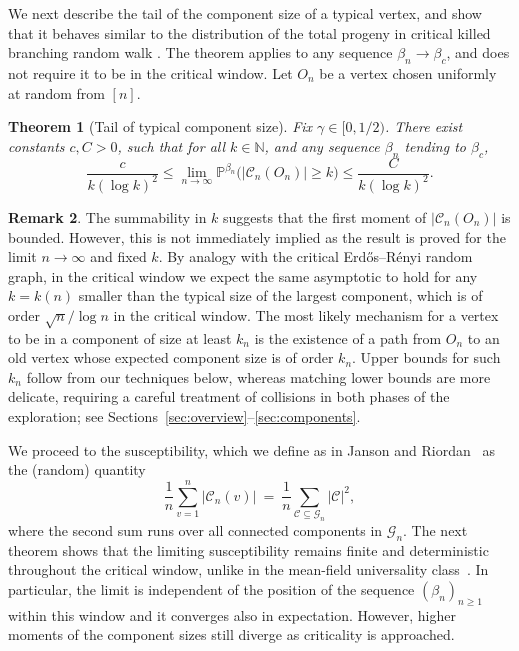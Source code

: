 \documentclass[a4paper, a4wide, 10pt, reqno]{amsart}
\theoremstyle{plain}
\newtheorem{theorem}{Theorem}[section]
\theoremstyle{definition}
\newtheorem{remark}[theorem]{Remark}
\numberwithin{equation}{section}
\newcommand{\N}{{\mathbb N}}
\newcommand{\sC}{{\mathscr C}}
\newcommand{\sG}{{\mathscr G}}
\begin{document}
We next describe the tail of the component size of a typical vertex, and show that it behaves similar to the distribution of the total progeny in critical killed branching random walk \cite{aidekon2010tail, AidekonHuZindy}. The theorem applies  to any sequence $\beta_n\to\beta_c$, and does not require it to be in  the critical window. Let $O_n$ be a vertex chosen uniformly at random from $[n]$.  

\begin{theorem}[Tail of typical component size]\label{thm:typtail}
	Fix $\gamma\in[0,1/2)$.
    There exist constants $c, C>0$, such that for all $k\in\N$, and any sequence $\beta_n$ tending to $\beta_c$,
	\begin{equation}\label{eq:typtail}
        \frac{c}{k(\log k)^2} \leq \lim_{n \to\infty}\mathbb P^{\beta_n} \big( |\sC_{n}(O_n)| \ge k \big)\leq \frac{C}{k(\log k)^2}.
	\end{equation}
\end{theorem}
\begin{remark}
The summability in $k$ suggests that the first moment of $|\sC_n(O_n)|$ is bounded. However, this is not immediately implied as the result is proved for the limit $n\to\infty$ and fixed $k$.  
By analogy with the critical Erd\H{o}s–R\'enyi random graph, in the critical window we expect the same asymptotic to hold for any $k=k(n)$ smaller than the typical size of the largest component, which is of order $\sqrt{n}/\log n$ in the critical window.  
The most likely mechanism for a vertex to be in a component of size at least $k_n$ is the existence of a path from $O_n$ to an old vertex whose expected component size is of order $k_n$.  
Upper bounds for such $k_n$ follow from our techniques below, whereas matching lower bounds are more delicate, requiring a careful treatment of collisions in both phases of the exploration; see Sections~\ref{sec:overview}–\ref{sec:components}.
\end{remark}
\noindent We proceed to the susceptibility, which we define as in Janson and Riordan~\cite{JansonRiordanSus} as the (random) quantity
\[
\frac{1}{n}\sum_{v=1}^n|\sC_n(v)|\ =\ \frac{1}{n}\sum_{\sC\subseteq \sG_n}|\sC|^2,
\]
where the second sum runs over all connected components in $\sG_n$.
The next theorem shows that the limiting susceptibility remains finite and deterministic throughout the critical window, unlike in the mean-field universality class~\cite{Luczak}.
In particular, the limit is independent of the position of the sequence $(\beta_n)_{n\ge 1}$	
  within this window and it converges also in expectation. However, higher moments of the component sizes still diverge as criticality is approached.
\end{document}
